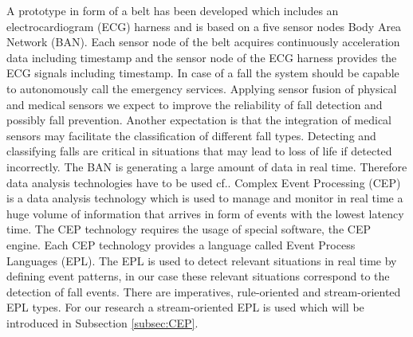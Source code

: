 \documentclass[10pt,journal,compsoc]{IEEEtran}
\begin{document}
A prototype in form of a belt has been developed which includes an electrocardiogram (ECG) harness and is based on a five sensor nodes Body Area Network (BAN). Each sensor node of the belt acquires continuously acceleration data including timestamp and the sensor node of the ECG harness provides the ECG signals including timestamp. In case of a fall the system should be capable to autonomously call the emergency services. Applying sensor fusion of physical and medical sensors we expect to improve the reliability of fall detection and possibly fall prevention. Another expectation is that the integration of medical sensors may facilitate the classification of different fall types. Detecting and classifying falls are critical in situations that may lead to loss of life if detected incorrectly. The BAN is generating a large amount of data in real time. Therefore data analysis technologies have to be used cf.\cite{LorenaFall}. Complex Event Processing (CEP) \cite{Esper:2016} is a data analysis technology which is used to manage and monitor in real time a huge volume of information that arrives in form of events with the lowest latency time. The CEP technology requires the usage of special software, the CEP engine. Each CEP technology provides a language called Event Process Languages (EPL). The EPL is used to detect relevant situations in real time by defining event patterns, in our case these relevant situations correspond to the detection of fall events. There are imperatives, rule-oriented and stream-oriented EPL types. For our research a stream-oriented EPL is used which will be introduced in Subsection \ref{subsec:CEP}.
\end{document}
